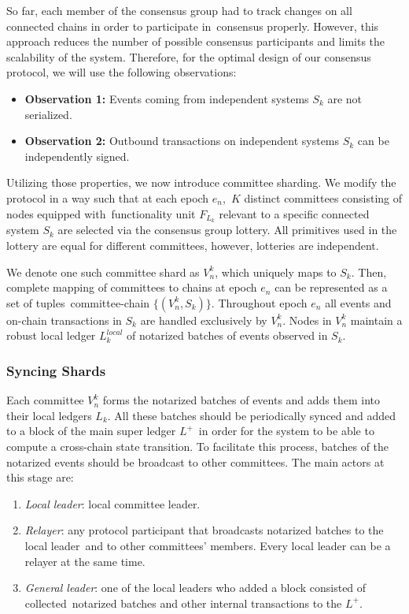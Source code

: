 So far, each member of the consensus group had to track changes on all connected chains in order to participate in\
consensus properly.
However, this approach reduces the number of possible consensus participants and limits the scalability of the system.
Therefore, for the optimal design of our consensus protocol, we will use the following observations:
\begin{itemize}
    \item[]\textbf{Observation 1:} Events coming from independent systems $S_k$ are not serialized.
    \item[]\textbf{Observation 2:} Outbound transactions on independent systems $S_k$ can be independently signed.
\end{itemize}

Utilizing those properties, we now introduce committee sharding.
We modify the protocol in a way such that at each epoch $e_n$,\
$K$ distinct committees consisting of nodes equipped with\
functionality unit $F_{L_k}$ relevant to a specific connected system $S_k$ are selected via the consensus group lottery.
All primitives used in the lottery are equal for different committees, however, lotteries are independent.

We denote one such committee shard as $V_n^k$, which uniquely maps to $S_k$.
Then, complete mapping of committees to chains at epoch $e_n$ can be represented as a set of tuples\
committee-chain $\{(V_n^k, S_k)\}$.
Throughout epoch $e_n$ all events and on-chain transactions in $S_k$ are handled exclusively by $V_n^k$.
Nodes in $V_n^k$ maintain a robust local ledger $L^{local}_k$ of notarized batches of events observed in $S_k$.

\subsubsection{Syncing Shards}

Each committee $V_n^k$ forms the notarized batches of events and adds them into their local ledgers $L_k$.
All these batches should be periodically synced and added to a block of the main super ledger $L^+$\
in order for the system to be able to compute a cross-chain state transition.
To facilitate this process, batches of the notarized events should be broadcast to other committees.
The main actors at this stage are:
\begin{enumerate}
    \item \emph{Local leader}: local committee leader.
    \item \emph{Relayer}: any protocol participant that broadcasts notarized batches to the local leader\
    and to other committees' members.
    Every local leader can be a relayer at the same time.
    \item \emph{General leader}: one of the local leaders who added a block consisted of collected\
    notarized batches and other internal transactions to the $L^+$.
\end{enumerate}

